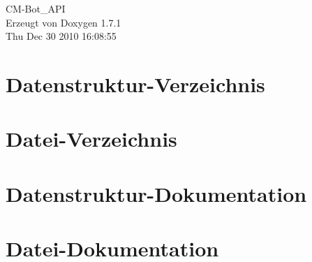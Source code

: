 \documentclass[a4paper]{report}
\begin{document}
\begin{titlepage}
\vspace*{7cm}
\begin{center}
{\Large CM-\/Bot\_\-API }\\
\vspace*{1cm}
{\large Erzeugt von Doxygen 1.7.1}\\
\vspace*{0.5cm}
{\small Thu Dec 30 2010 16:08:55}\\
\end{center}
\end{titlepage}
\clearemptydoublepage
{}
\tableofcontents
\clearemptydoublepage
{}
\chapter{Datenstruktur-\/Verzeichnis}

\chapter{Datei-\/Verzeichnis}

\chapter{Datenstruktur-\/Dokumentation}










\chapter{Datei-\/Dokumentation}








































\printindex
\end{document}
